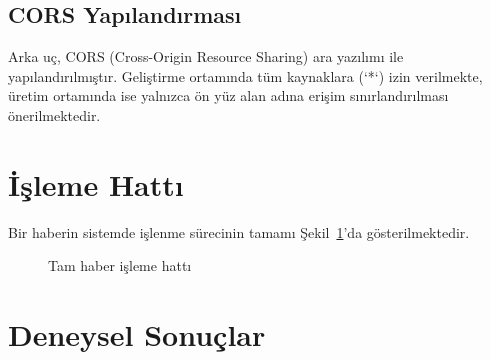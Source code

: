 \documentclass[conference]{IEEEtran}
\begin{document}
\subsection{CORS Yapılandırması}

Arka uç, CORS (Cross-Origin Resource Sharing) ara yazılımı ile yapılandırılmıştır. Geliştirme ortamında tüm kaynaklara (`*`) izin verilmekte, üretim ortamında ise yalnızca ön yüz alan adına erişim sınırlandırılması önerilmektedir.

\section{İşleme Hattı}
\label{sec:pipeline}

Bir haberin sistemde işlenme sürecinin tamamı Şekil~\ref{fig:pipeline}'da gösterilmektedir.

\begin{figure}[H]
\centering
{}
\caption{Tam haber işleme hattı}
\label{fig:pipeline}
\end{figure}

\section{Deneysel Sonuçlar}
\label{sec:sonuclar}
\end{document}
